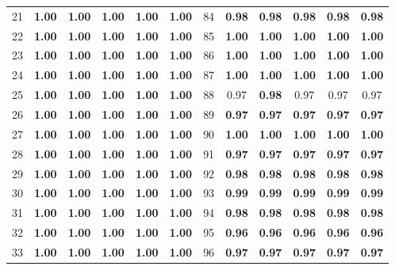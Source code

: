 \documentclass{article}
\begin{document}
{\begin{longtable}{cccccc@{\qquad}cccccc}
21 & \textbf{1.00} & \textbf{1.00} & \textbf{1.00} & \textbf{1.00} & \textbf{1.00} & 84 & \textbf{0.98} & \textbf{0.98} & \textbf{0.98} & \textbf{0.98} & \textbf{0.98} \\
22 & \textbf{1.00} & \textbf{1.00} & \textbf{1.00} & \textbf{1.00} & \textbf{1.00} & 85 & \textbf{1.00} & \textbf{1.00} & \textbf{1.00} & \textbf{1.00} & \textbf{1.00} \\
23 & \textbf{1.00} & \textbf{1.00} & \textbf{1.00} & \textbf{1.00} & \textbf{1.00} & 86 & \textbf{1.00} & \textbf{1.00} & \textbf{1.00} & \textbf{1.00} & \textbf{1.00} \\
24 & \textbf{1.00} & \textbf{1.00} & \textbf{1.00} & \textbf{1.00} & \textbf{1.00} & 87 & \textbf{1.00} & \textbf{1.00} & \textbf{1.00} & \textbf{1.00} & \textbf{1.00} \\
25 & \textbf{1.00} & \textbf{1.00} & \textbf{1.00} & \textbf{1.00} & \textbf{1.00} & 88 & 0.97 & \textbf{0.98} & 0.97 & 0.97 & 0.97 \\
26 & \textbf{1.00} & \textbf{1.00} & \textbf{1.00} & \textbf{1.00} & \textbf{1.00} & 89 & \textbf{0.97} & \textbf{0.97} & \textbf{0.97} & \textbf{0.97} & \textbf{0.97} \\
27 & \textbf{1.00} & \textbf{1.00} & \textbf{1.00} & \textbf{1.00} & \textbf{1.00} & 90 & \textbf{1.00} & \textbf{1.00} & \textbf{1.00} & \textbf{1.00} & \textbf{1.00} \\
28 & \textbf{1.00} & \textbf{1.00} & \textbf{1.00} & \textbf{1.00} & \textbf{1.00} & 91 & \textbf{0.97} & \textbf{0.97} & \textbf{0.97} & \textbf{0.97} & \textbf{0.97} \\
29 & \textbf{1.00} & \textbf{1.00} & \textbf{1.00} & \textbf{1.00} & \textbf{1.00} & 92 & \textbf{0.98} & \textbf{0.98} & \textbf{0.98} & \textbf{0.98} & \textbf{0.98} \\
30 & \textbf{1.00} & \textbf{1.00} & \textbf{1.00} & \textbf{1.00} & \textbf{1.00} & 93 & \textbf{0.99} & \textbf{0.99} & \textbf{0.99} & \textbf{0.99} & \textbf{0.99} \\
31 & \textbf{1.00} & \textbf{1.00} & \textbf{1.00} & \textbf{1.00} & \textbf{1.00} & 94 & \textbf{0.98} & \textbf{0.98} & \textbf{0.98} & \textbf{0.98} & \textbf{0.98} \\
32 & \textbf{1.00} & \textbf{1.00} & \textbf{1.00} & \textbf{1.00} & \textbf{1.00} & 95 & \textbf{0.96} & \textbf{0.96} & \textbf{0.96} & \textbf{0.96} & \textbf{0.96} \\
33 & \textbf{1.00} & \textbf{1.00} & \textbf{1.00} & \textbf{1.00} & \textbf{1.00} & 96 & \textbf{0.97} & \textbf{0.97} & \textbf{0.97} & \textbf{0.97} & \textbf{0.97} \\

\end{longtable}}
\end{document}
